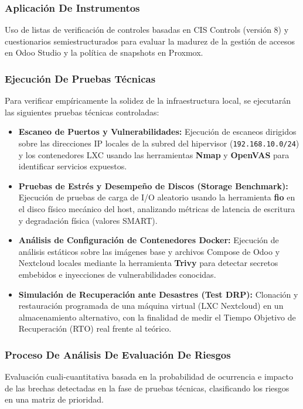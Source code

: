 \documentclass[12pt]{article}
\begin{document}
\subsubsection{Aplicación De Instrumentos}
Uso de listas de verificación de controles basadas en CIS Controls (versión 8) y cuestionarios semiestructurados para evaluar la madurez de la gestión de accesos en Odoo Studio y la política de snapshots en Proxmox.

\subsubsection{Ejecución De Pruebas Técnicas}
Para verificar empíricamente la solidez de la infraestructura local, se ejecutarán las siguientes pruebas técnicas controladas:
\begin{itemize}
    \item \textbf{Escaneo de Puertos y Vulnerabilidades:} Ejecución de escaneos dirigidos sobre las direcciones IP locales de la subred del hipervisor (\texttt{192.168.10.0/24}) y los contenedores LXC usando las herramientas \textbf{Nmap} y \textbf{OpenVAS} para identificar servicios expuestos.
    \item \textbf{Pruebas de Estrés y Desempeño de Discos (Storage Benchmark):} Ejecución de pruebas de carga de I/O aleatorio usando la herramienta \textbf{fio} en el disco físico mecánico del host, analizando métricas de latencia de escritura y degradación física (valores SMART).
    \item \textbf{Análisis de Configuración de Contenedores Docker:} Ejecución de análisis estáticos sobre las imágenes base y archivos Compose de Odoo y Nextcloud locales mediante la herramienta \textbf{Trivy} para detectar secretos embebidos e inyecciones de vulnerabilidades conocidas.
    \item \textbf{Simulación de Recuperación ante Desastres (Test DRP):} Clonación y restauración programada de una máquina virtual (LXC Nextcloud) en un almacenamiento alternativo, con la finalidad de medir el Tiempo Objetivo de Recuperación (RTO) real frente al teórico.
\end{itemize}

\subsubsection{Proceso De Análisis De Evaluación De Riesgos}
Evaluación cuali-cuantitativa basada en la probabilidad de ocurrencia e impacto de las brechas detectadas en la fase de pruebas técnicas, clasificando los riesgos en una matriz de prioridad.
\end{document}
